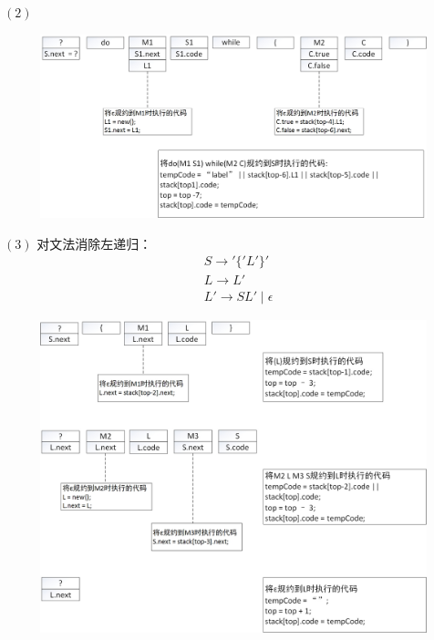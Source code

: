 \documentclass[UTF8,noindent]{ctexart}
\begin{document}
$(2)$
\begin{figure}[H]
  \centering
  \includegraphics[scale = 0.3]{./fig/5-5-5-b.jpg}
\end{figure}

$(3)$
对文法消除左递归：
\begin{align*}
  &S\rightarrow '\{'L'\}'\\
  & L\rightarrow L'\\
  & L'\rightarrow SL'\mid \epsilon
\end{align*}
\begin{figure}[H]
  \centering
  \includegraphics[scale = 0.4]{./fig/5-5-5-c.jpg}
\end{figure}
\end{document}
